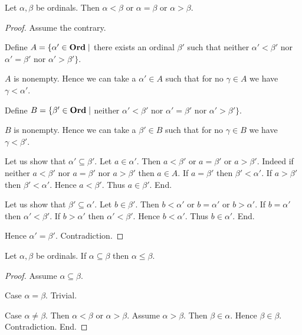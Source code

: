 \documentclass[10pt]{article}
\begin{document}
  \begin{forthel}
    \begin{proposition}[id=SET_THEORY_02_1718825707896832,printid]
      Let $\alpha, \beta$ be ordinals.
      Then $\alpha < \beta$ or $\alpha = \beta$ or $\alpha > \beta$.
    \end{proposition}
    \begin{proof}
      Assume the contrary.
      
      Define $A = \{ \alpha' \in \textbf{Ord} \mid$ there exists an ordinal $\beta'$ such that neither $\alpha' < \beta'$ nor $\alpha' = \beta'$ nor $\alpha' > \beta' \}$.
      
      $A$ is nonempty.
      Hence we can take a $\alpha' \in A$ such that for no $\gamma \in A$ we have $\gamma < \alpha'$.
      
      Define $B = \{ \beta' \in \textbf{Ord} \mid$ neither $\alpha' < \beta'$ nor $\alpha' = \beta'$ nor $\alpha' > \beta' \}$.
      
      $B$ is nonempty.
      Hence we can take a $\beta' \in B$ such that for no $\gamma \in B$ we have $\gamma < \beta'$.

      Let us show that $\alpha' \subseteq \beta'$.
        Let $a \in \alpha'$.
        Then $a < \beta'$ or $a = \beta'$ or $a > \beta'$.
        Indeed if neither $a < \beta'$ nor $a = \beta'$ nor $a > \beta'$ then
        $a \in A$.
        If $a = \beta'$ then $\beta' < \alpha'$.
        If $a > \beta'$ then $\beta' < \alpha'$.
        Hence $a < \beta'$.
        Thus $a \in \beta'$.
      End.

      Let us show that $\beta' \subseteq \alpha'$.
        Let $b \in \beta'$.
        Then $b < \alpha'$ or $b = \alpha'$ or $b > \alpha'$.
        If $b = \alpha'$ then $\alpha' < \beta'$.
        If $b > \alpha'$ then $\alpha' < \beta'$.
        Hence $b < \alpha'$.
        Thus $b \in \alpha'$.
      End.

      Hence $\alpha' = \beta'$.
      Contradiction.
    \end{proof}
  \end{forthel}

  \begin{forthel}
    \begin{proposition}[id=SET_THEORY_02_610496856195072,printid]
      Let $\alpha, \beta$ be ordinals.
      If $\alpha \subseteq \beta$ then $\alpha \leq \beta$.
    \end{proposition}
    \begin{proof}
      Assume $\alpha \subseteq \beta$.

      Case $\alpha = \beta$. Trivial.

      Case $\alpha \neq \beta$.
        Then $\alpha < \beta$ or $\alpha > \beta$.
        Assume $\alpha > \beta$.
        Then $\beta \in \alpha$.
        Hence $\beta \in \beta$.
        Contradiction.
      End.
    \end{proof}
  \end{forthel}
\end{document}
